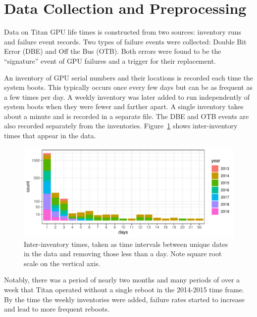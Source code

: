 \section{Data Collection and Preprocessing}
\label{section:dataprep}
Data on Titan GPU life times is constructed from two sources:
inventory runs and failure event records. Two types of failure events
were collected: Double Bit Error (DBE) and Off the Bus (OTB). Both
errors were found to be the ``signature'' event of GPU failures and a
trigger for their replacement.

An inventory of GPU serial numbers and their locations is recorded
each time the system boots. This typically occurs once every few days
but can be as frequent as a few times per day. A weekly inventory was
later added to run independently of system boots when they were fewer
and farther apart. A single inventory takes about a minute and is
recorded in a separate file. The DBE and OTB events are also recorded
separately from the inventories.  Figure~\ref{fig:inventory} shows
inter-inventory times that appear in the data.
\begin{figure}[bt]
  \begin{center}
    \includegraphics[width=\columnwidth]{figs/attention_intervals001.pdf}
  \end{center}
  \caption{Inter-inventory times, taken as time intervals between
    unique dates in the data and removing those less than a day. Note
    square root scale on the vertical axis.}
  \label{fig:inventory}
\end{figure}
Notably, there was a period of nearly two months and many periods of over a
week that Titan operated without a single reboot in the
2014-2015 time frame. By the time the weekly inventories were added,
failure rates started to increase and lead to more frequent reboots.

